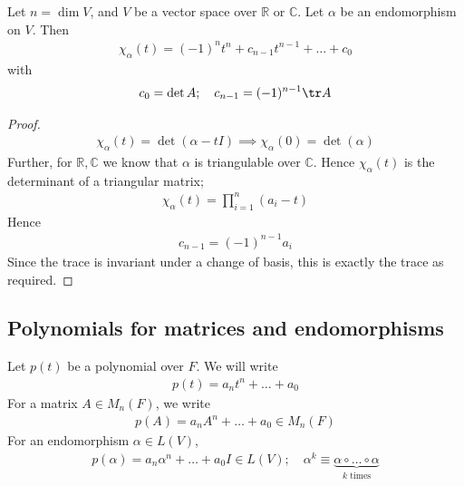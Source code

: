\begin{lemma}
	Let $n = \dim V$, and $V$ be a vector space over $\mathbb R$ or $\mathbb C$.
	Let $\alpha$ be an endomorphism on $V$.
	Then
	\begin{align*}
		\chi_\alpha(t) = (-1)^n t^n + c_{n-1} t^{n-1} + \dots + c_0
	\end{align*}
	with
	\begin{align*}
		c_0 = \det A;\quad c_{n-1} = (-1)^{n-1} \tr A
	\end{align*}
\end{lemma}
\begin{proof}
	\begin{align*}
		\chi_\alpha(t) = \det(\alpha - t I) \implies \chi_\alpha(0) = \det(\alpha)
	\end{align*}
	Further, for $\mathbb R, \mathbb C$ we know that $\alpha$ is triangulable over $\mathbb C$.
	Hence $\chi_\alpha(t)$ is the determinant of a triangular matrix;
	\begin{align*}
		\chi_\alpha(t) = \prod_{i=1}^n (a_i - t)
	\end{align*}
	Hence
	\begin{align*}
		c_{n-1} = (-1)^{n-1} a_i
	\end{align*}
	Since the trace is invariant under a change of basis, this is exactly the trace as required.
\end{proof}

\subsection{Polynomials for matrices and endomorphisms}
Let $p(t)$ be a polynomial over $F$.
We will write
\begin{align*}
	p(t) = a_n t^n + \dots + a_0
\end{align*}
For a matrix $A \in M_n(F)$, we write
\begin{align*}
	p(A) = a_n A^n + \dots + a_0 \in M_n(F)
\end{align*}
For an endomorphism $\alpha \in L(V)$,
\begin{align*}
	p(\alpha) = a_n \alpha^n + \dots + a_0 I \in L(V);\quad \alpha^k \equiv \underbrace{\alpha \circ \dots \circ \alpha}_{k \text{ times}}
\end{align*}

